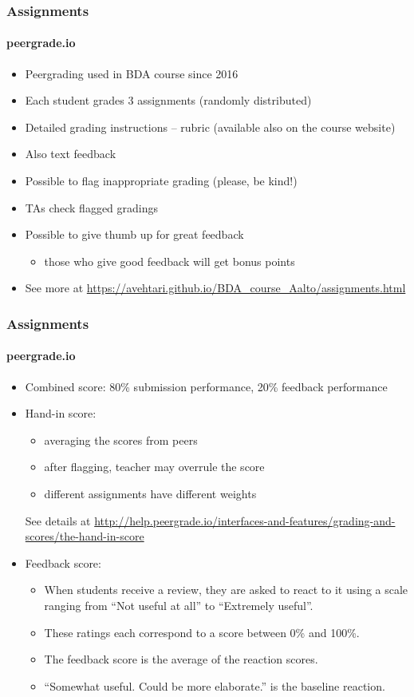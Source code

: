 \documentclass[english,t]{beamer}
\begin{document}
\begin{frame}
  \frametitle{Assignments}  %
  \framesubtitle{peergrade.io}
  \begin{itemize}
  \item Peergrading used in BDA course since 2016
  \item Each student grades 3 assignments (randomly distributed)
  \item Detailed grading instructions -- rubric (available also on the course website)
  \item Also text feedback
  \item Possible to flag inappropriate grading (please, be kind!)
  \item TAs check flagged gradings
  \item Possible to give thumb up for great feedback
    \begin{itemize}
    \item those who give good feedback will get bonus points
    \end{itemize}
  \item See more at
    \url{https://avehtari.github.io/BDA_course_Aalto/assignments.html}
  \end{itemize}
  
\end{frame}

\begin{frame}
  \frametitle{Assignments}  %
  \framesubtitle{peergrade.io}

  \begin{itemize}
  \item Combined score: 80\% submission performance, 20\% feedback performance
    \pause
  \item Hand-in score:
    \begin{itemize}
    \item averaging the scores from peers
    \item after flagging, teacher may overrule the score
    \item different assignments have different weights
    \end{itemize}
    See details at \url{http://help.peergrade.io/interfaces-and-features/grading-and-scores/the-hand-in-score}
    \pause
  \item Feedback score:
    \begin{itemize}
    \item When students receive a review, they are asked to react to
      it using a scale ranging from ``Not useful at all'' to ``Extremely
      useful''.
    \item These ratings each correspond to a score between 0\% and 100\%.
    \item The feedback score is the average of the reaction scores.
    \item ``Somewhat useful. Could be more elaborate.'' is the
      baseline reaction.
    \end{itemize}
    
  \end{itemize}
  
\end{frame}
\end{document}
